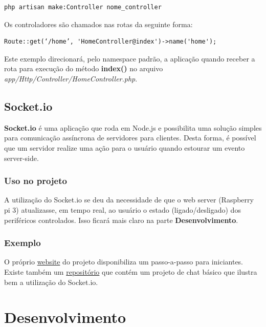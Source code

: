 \documentclass[
12pt,				%
openany,			%
twoside,			%
a4paper,			%
english,			%
french,				%
spanish,			%
brazil,				%
]{abntex2}
\begin{document}
\begin{lstlisting}[style=bash,caption={Criando um controller}]
    php artisan make:Controller nome_controller
\end{lstlisting}

Os controladores são chamados nas rotas da seguinte forma:

\begin{lstlisting}[style=php,caption={Prefixos de caminho}]
    Route::get(‘/home’, 'HomeController@index')->name('home'); 
\end{lstlisting}

Este exemplo direcionará, pelo namespace padrão, a aplicação quando receber a rota para execução do método \textbf{index()} no arquivo \textit{app/Http/Controller/HomeController.php}.

\chapter{Socket.io}

\textbf{Socket.io} é uma aplicação que roda em Node.js e possibilita uma solução simples para comunicação assíncrona de servidores para clientes. Desta forma, é possível que um servidor realize uma ação para o usuário quando estourar um evento server-side. 

\section{Uso no projeto}
A utilização do Socket.io se deu da necessidade de que o web server (Raspberry pi 3) atualizasse, em tempo real, ao usuário o estado (ligado/desligado) dos periféricos controlados. Isso ficará mais claro na parte \textbf{Desenvolvimento}.

\section{Exemplo}
O próprio \href{https://socket.io/get-started}{website} do projeto disponibiliza um passo-a-passo para iniciantes. Existe também um \href{https://github.com/socketio/chat-example.git}{repositório} que contém um projeto de chat básico que ilustra bem a utilização do Socket.io.

\part{Desenvolvimento}
\end{document}
